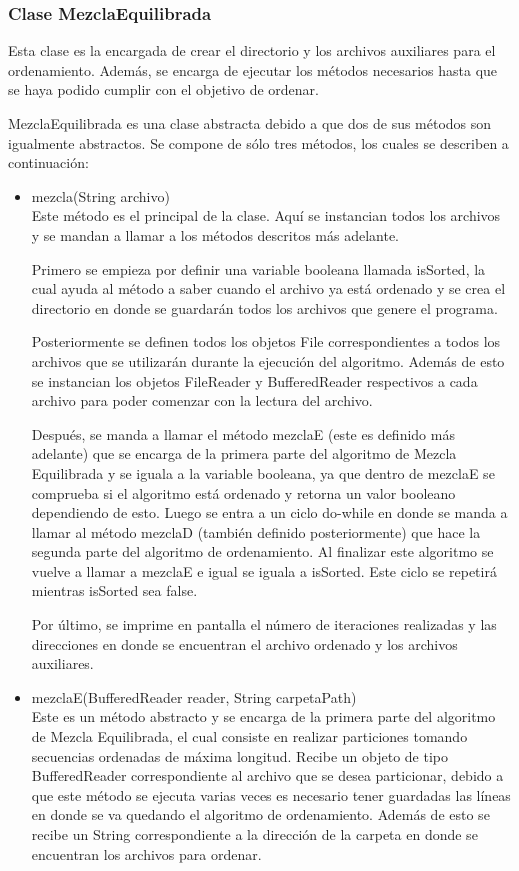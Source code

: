 \documentclass[11pt]{article}
\begin{document}
\subsubsection{Clase MezclaEquilibrada}
Esta clase es la encargada de crear el directorio y los archivos auxiliares para el ordenamiento. Además, se encarga de ejecutar los métodos necesarios hasta que se haya podido cumplir con el objetivo de ordenar. 
\par
MezclaEquilibrada es una clase abstracta debido a que dos de sus métodos son igualmente abstractos. Se compone de sólo tres métodos, los cuales se describen a continuación:
\begin{itemize}
\item mezcla(String archivo)\\
Este método es el principal de la clase. Aquí se instancian todos los archivos y se mandan a llamar a los métodos descritos más adelante. 
\par
Primero se empieza por definir una variable booleana llamada isSorted, la cual ayuda al método a saber cuando el archivo ya está ordenado y se crea el directorio en donde se guardarán todos los archivos que genere el programa.
\par
Posteriormente se definen todos los objetos File correspondientes a todos los archivos que se utilizarán durante la ejecución del algoritmo. Además de esto se instancian los objetos FileReader y BufferedReader respectivos a cada archivo para poder comenzar con la lectura del archivo. 
\par
Después, se manda a llamar el método mezclaE (este es definido más adelante) que se encarga de la primera parte del algoritmo de Mezcla Equilibrada y se iguala a la variable booleana, ya que dentro de mezclaE se comprueba si el algoritmo está ordenado y retorna un valor booleano dependiendo de esto. Luego se entra a un ciclo do-while en donde se manda a llamar al método mezclaD (también definido posteriormente) que hace la segunda parte del algoritmo de ordenamiento. Al finalizar este algoritmo se vuelve a llamar a mezclaE e igual se iguala a isSorted. Este ciclo se repetirá mientras isSorted sea false.
\par
Por último, se imprime en pantalla el número de iteraciones realizadas y las direcciones en donde se encuentran el archivo ordenado y los archivos auxiliares.
\item mezclaE(BufferedReader reader, String carpetaPath) \\
Este es un método abstracto y se encarga de la primera parte del algoritmo de Mezcla Equilibrada, el cual consiste en realizar particiones tomando secuencias ordenadas de máxima longitud. Recibe un objeto de tipo BufferedReader correspondiente al archivo que se desea particionar, debido a que este método se ejecuta varias veces es necesario tener guardadas las líneas en donde se va quedando el algoritmo de ordenamiento. Además de esto se recibe un String correspondiente a la dirección de la carpeta en donde se encuentran los archivos para ordenar.

\end{itemize}
\end{document}
